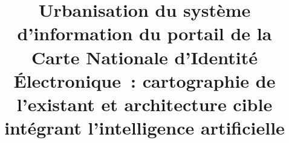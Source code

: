 \documentclass[conference,a4paper]{IEEEtran}
\begin{document}
\title{Urbanisation du système d'information du portail de la Carte Nationale d'Identité Électronique~: cartographie de l'existant et architecture cible intégrant l'intelligence artificielle}

\author{%
}

\maketitle













\printbibliography
\end{document}
